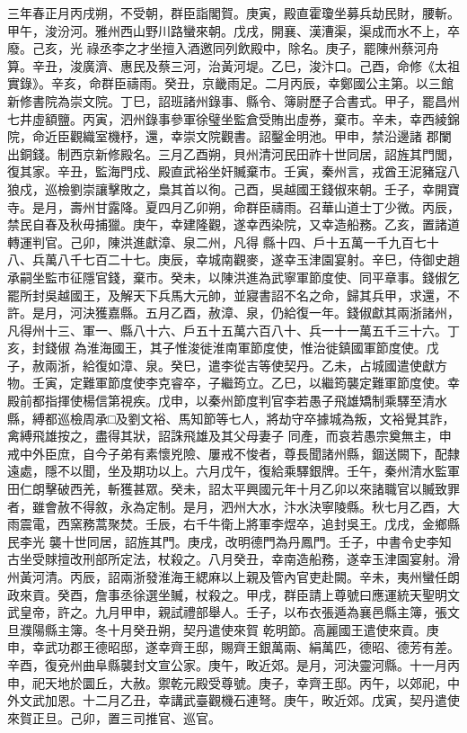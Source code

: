 \begin{pinyinscope}
 三年春正月丙戌朔，不受朝，群臣詣閣賀。庚寅，殿直霍瓊坐募兵劫民財，腰斬。甲午，浚汾河。雅州西山野川路蠻來朝。戊戌，開襄、漢漕渠，渠成而水不上，卒廢。己亥，光
 祿丞李之才坐擅入酒邀同列飲殿中，除名。庚子，罷陳州蔡河舟算。辛丑，浚廣濟、惠民及蔡三河，治黃河堤。乙巳，浚汴口。己酉，命修《太祖實錄》。辛亥，命群臣禱雨。癸丑，京畿雨足。二月丙辰，幸鄭國公主第。以三館新修書院為崇文院。丁巳，詔班諸州錄事、縣令、簿尉歷子合書式。甲子，罷昌州七井虛額鹽。丙寅，泗州錄事參軍徐璧坐監倉受賄出虛券，棄市。辛未，幸西綾錦院，命近臣觀織室機杼，還，幸崇文院觀書。詔鑿金明池。甲申，禁沿邊諸
 郡闌出銅錢。制西京新修殿名。三月乙酉朔，貝州清河民田祚十世同居，詔旌其門閭，復其家。辛丑，監海門戍、殿直武裕坐奸贓棄市。壬寅，秦州言，戎酋王泥豬寇八狼戍，巡檢劉崇讓擊敗之，梟其首以徇。己酉，吳越國王錢俶來朝。壬子，幸開寶寺。是月，壽州甘露降。夏四月乙卯朔，命群臣禱雨。召華山道士丁少微。丙辰，禁民自春及秋毋捕獵。庚午，幸建隆觀，遂幸西染院，又幸造船務。乙亥，置諸道轉運判官。己卯，陳洪進獻漳、泉二州，凡得
 縣十四、戶十五萬一千九百七十八、兵萬八千七百二十七。庚辰，幸城南觀麥，遂幸玉津園宴射。辛巳，侍御史趙承嗣坐監市征隱官錢，棄市。癸未，以陳洪進為武寧軍節度使、同平章事。錢俶乞罷所封吳越國王，及解天下兵馬大元帥，並寢書詔不名之命，歸其兵甲，求還，不許。是月，河決獲嘉縣。五月乙酉，赦漳、泉，仍給復一年。錢俶獻其兩浙諸州，凡得州十三、軍一、縣八十六、戶五十五萬六百八十、兵一十一萬五千三十六。丁亥，封錢俶
 為淮海國王，其子惟浚徙淮南軍節度使，惟治徙鎮國軍節度使。戊子，赦兩浙，給復如漳、泉。癸巳，遣李從吉等使契丹。乙未，占城國遣使獻方物。壬寅，定難軍節度使李克睿卒，子繼筠立。乙巳，以繼筠襲定難軍節度使。幸殿前都指揮使楊信第視疾。戊申，以秦州節度判官李若愚子飛雄矯制乘驛至清水縣，縛都巡檢周承□及劉文裕、馬知節等七人，將劫守卒據城為叛，文裕覺其詐，禽縛飛雄按之，盡得其狀，詔誅飛雄及其父母妻子
 同產，而哀若愚宗奠無主，申戒中外臣庶，自今子弟有素懷兇險、屢戒不悛者，尊長聞諸州縣，錮送闕下，配隸遠處，隱不以聞，坐及期功以上。六月戊午，復給乘驛銀牌。壬午，秦州清水監軍田仁朗擊破西羌，斬獲甚眾。癸未，詔太平興國元年十月乙卯以來諸職官以贓致罪者，雖會赦不得敘，永為定制。是月，泗州大水，汴水決寧陵縣。秋七月乙酉，大雨震電，西窯務蒿聚焚。壬辰，右千牛衛上將軍李煜卒，追封吳王。戊戌，金鄉縣民李光
 襲十世同居，詔旌其門。庚戌，改明德門為丹鳳門。壬子，中書令史李知古坐受賕擅改刑部所定法，杖殺之。八月癸丑，幸南造船務，遂幸玉津園宴射。滑州黃河清。丙辰，詔兩浙發淮海王緦麻以上親及管內官吏赴闕。辛未，夷州蠻任朗政來貢。癸酉，詹事丞徐選坐贓，杖殺之。甲戌，群臣請上尊號曰應運統天聖明文武皇帝，許之。九月甲申，親試禮部舉人。壬子，以布衣張遁為襄邑縣主簿，張文旦濮陽縣主簿。冬十月癸丑朔，契丹遣使來賀
 乾明節。高麗國王遣使來貢。庚申，幸武功郡王德昭邸，遂幸齊王邸，賜齊王銀萬兩、絹萬匹，德昭、德芳有差。辛酉，復兗州曲阜縣襲封文宣公家。庚午，畋近郊。是月，河決靈河縣。十一月丙申，祀天地於圜丘，大赦。禦乾元殿受尊號。庚子，幸齊王邸。丙午，以郊祀，中外文武加恩。十二月乙丑，幸講武臺觀機石連弩。庚午，畋近郊。戊寅，契丹遣使來賀正旦。己卯，置三司推官、巡官。




\end{pinyinscope}
